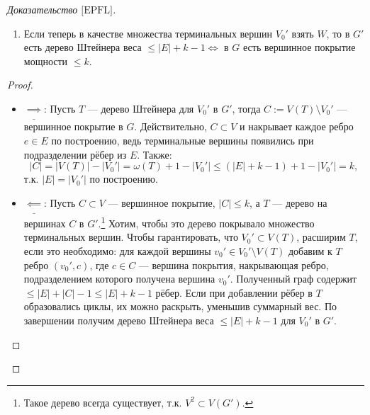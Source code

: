 \documentclass[11pt,a4paper]{report}
\def\le{\leqslant}
\theoremstyle{definition}
\theoremstyle{definition}
\theoremstyle{definition}
\begin{document}
\begin{proof}[Доказательство $ \text{[EPFL]} $]
\begin{enumerate}
\begin{enumerate}
\begin{figure}[!hbtp]
					\caption{\textit{Пример конструкции: красные вершины — $ V $, голубые — $W$, штрихпунктирные рёбра добавлены при дополнении до полного графа, сплошные были изначально. Все веса единичные. }}
				\end{figure}
				\item Если теперь в качестве множества терминальных вершин $ V_0' $ взять $ W $, то в $G'$ есть дерево Штейнера веса $ \le |E| + k - 1 \iff $ в $G$ есть вершинное покрытие мощности $\le k$.
			\end{enumerate}
			\begin{proof}$  $
				\begin{itemize}
					\item $ \underline{\implies} $: Пусть $T$ — дерево Штейнера для $V_0'$ в $G'$, тогда $C := V(T) \setminus V_0'$ — вершинное покрытие в $G$. Действительно, $ C \subset V $ и накрывает каждое ребро $e \in E$ по построению, ведь терминальные вершины появились при подразделении рёбер из $E$. Также:
					$$ |C| = |V(T)| - |V_0'| = \omega(T) + 1 - |V_0'| \le (|E| + k - 1) + 1 - |V_0'| = k,$$ т.к. $|E| = |V_0'|$ по построению. 
					\item $ \underline{\impliedby} $:  Пусть $C \subset V$ — вершинное покрытие, $|C| \le k$, а $T$ — дерево на вершинах $C$ в $G'$.\footnote{Такое дерево всегда существует, т.к. $V^2 \subset V(G')$.} Хотим, чтобы это дерево покрывало множество терминальных вершин. Чтобы гарантировать, что $V_0' \subset V(T)$, расширим $T$, если это необходимо: для каждой вершины $v_0' \in V_0' \setminus V(T)$ добавим к $T$ ребро $(v_0', c)$, где $c \in C$ — вершина покрытия, накрывающая ребро, подразделением которого получена вершина $v_0'$. Полученный граф содержит $\le |E| + |C| - 1 \le |E| + k - 1$ рёбер. Если при добавлении рёбер в $T$ образовались циклы, их можно раскрыть, уменьшив суммарный вес. По завершении получим дерево Штейнера веса $\le |E| + k - 1$ для $V_0'$ в $G'$.

\end{itemize}
\end{proof}
\end{enumerate}
\end{proof}
\end{document}
